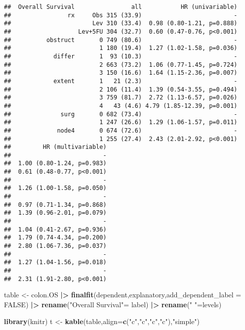 \documentclass[
]{article}
\newenvironment{Shaded}{\begin{snugshade}}{\end{snugshade}}
\newcommand{\AttributeTok}[1]{\textcolor[rgb]{0.13,0.29,0.53}{#1}}
\newcommand{\ConstantTok}[1]{\textcolor[rgb]{0.56,0.35,0.01}{#1}}
\newcommand{\FunctionTok}[1]{\textcolor[rgb]{0.13,0.29,0.53}{\textbf{#1}}}
\newcommand{\NormalTok}[1]{#1}
\newcommand{\OtherTok}[1]{\textcolor[rgb]{0.56,0.35,0.01}{#1}}
\newcommand{\SpecialCharTok}[1]{\textcolor[rgb]{0.81,0.36,0.00}{\textbf{#1}}}
\newcommand{\StringTok}[1]{\textcolor[rgb]{0.31,0.60,0.02}{#1}}
\begin{document}
\begin{verbatim}
##  Overall Survival                all           HR (univariable)
##                rx     Obs 315 (33.9)                          -
##                       Lev 310 (33.4)  0.98 (0.80-1.21, p=0.888)
##                   Lev+5FU 304 (32.7)  0.60 (0.47-0.76, p<0.001)
##          obstruct       0 749 (80.6)                          -
##                         1 180 (19.4)  1.27 (1.02-1.58, p=0.036)
##            differ       1  93 (10.3)                          -
##                         2 663 (73.2)  1.06 (0.77-1.45, p=0.724)
##                         3 150 (16.6)  1.64 (1.15-2.36, p=0.007)
##            extent       1   21 (2.3)                          -
##                         2 106 (11.4)  1.39 (0.54-3.55, p=0.494)
##                         3 759 (81.7)  2.72 (1.13-6.57, p=0.026)
##                         4   43 (4.6) 4.79 (1.85-12.39, p=0.001)
##              surg       0 682 (73.4)                          -
##                         1 247 (26.6)  1.29 (1.06-1.57, p=0.011)
##             node4       0 674 (72.6)                          -
##                         1 255 (27.4)  2.43 (2.01-2.92, p<0.001)
##         HR (multivariable)
##                          -
##  1.00 (0.80-1.24, p=0.983)
##  0.61 (0.48-0.77, p<0.001)
##                          -
##  1.26 (1.00-1.58, p=0.050)
##                          -
##  0.97 (0.71-1.34, p=0.868)
##  1.39 (0.96-2.01, p=0.079)
##                          -
##  1.04 (0.41-2.67, p=0.936)
##  1.79 (0.74-4.34, p=0.200)
##  2.80 (1.06-7.36, p=0.037)
##                          -
##  1.27 (1.04-1.56, p=0.018)
##                          -
##  2.31 (1.91-2.80, p<0.001)
\end{verbatim}

\begin{Shaded}
\begin{Highlighting}[]
\NormalTok{table }\OtherTok{\textless{}{-}}\NormalTok{ colon.OS }\SpecialCharTok{|\textgreater{}} 
  \FunctionTok{finalfit}\NormalTok{(dependent,explanatory,}\AttributeTok{add\_dependent\_label =} \ConstantTok{FALSE}\NormalTok{) }\SpecialCharTok{|\textgreater{}} 
  \FunctionTok{rename}\NormalTok{(}\StringTok{"Overall Survival"}\OtherTok{=}\NormalTok{ label) }\SpecialCharTok{|\textgreater{}} 
  \FunctionTok{rename}\NormalTok{(}\StringTok{" "}\OtherTok{=}\NormalTok{levels) }

\FunctionTok{library}\NormalTok{(knitr)}
\NormalTok{t }\OtherTok{\textless{}{-}} \FunctionTok{kable}\NormalTok{(table,}\AttributeTok{align=}\FunctionTok{c}\NormalTok{(}\StringTok{"c"}\NormalTok{,}\StringTok{"c"}\NormalTok{,}\StringTok{"c"}\NormalTok{,}\StringTok{"c"}\NormalTok{),}\StringTok{"simple"}\NormalTok{)}
\end{Highlighting}
\end{Shaded}
\end{document}
